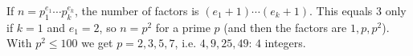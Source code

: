 If $n=p_1^{e_1}\cdots p_k^{e_k}$, the number of factors is $(e_1+1)\cdots(e_k+1)$. This equals $3$ only if $k=1$ and $e_1=2$, so $n=p^2$ for a prime $p$ (and then the factors are $1,p,p^2$). With $p^2\le100$ we get $p=2,3,5,7$, i.e. $4,9,25,49$: $\boxed{4}$ integers.
